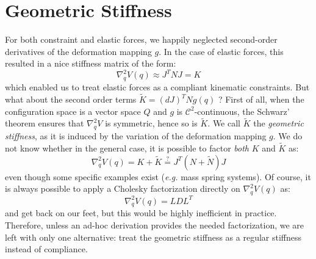 \documentclass{article}
\newcommand{\dd}{d}
\newcommand{\block}[1]{\left(#1\right)}
\begin{document}
\section{Geometric Stiffness}
%
For both constraint and elastic forces, we happily neglected
second-order derivatives of the deformation mapping $g$. In the case
of elastic forces, this resulted in a nice stiffness matrix of the
form:
%
\begin{equation}
  \nabla_q^2 V(q) \approx J^T N J = K
\end{equation}
%
which enabled us to treat elastic forces as a compliant kinematic
constraints. But what about the second order terms $\tilde{K}=(\dd
J)^T N g(q)$ ? First of all, when the configuration space is a vector
space $Q$ and $g$ is $\mathcal{C}^2$-continuous, the Schwarz' theorem
ensures that $\nabla_q^2 V$ is symmetric, hence so is $\tilde{K}$. We
call $\tilde{K}$ the \emph{geometric stiffness}, as it is induced by
the variation of the deformation mapping $g$. We do not know whether
in the general case, it is possible to factor \emph{both} $K$ and
$\tilde{K}$ as:
%
\begin{equation}
  \nabla_q^2 V(q) = K + \tilde{K} \overset{?}{=} J^T\block{N + \tilde{N}}J
\end{equation}
%
even though some specific examples exist (\emph{e.g.} mass spring
systems). Of course, it is always possible to apply a Cholesky
factorization directly on $\nabla_q^2 V(q)$ as:
%
\begin{equation}
  \nabla_q^2 V(q) = LDL^T
\end{equation}
%
and get back on our feet, but this would be highly inefficient in
practice. Therefore, unless an ad-hoc derivation provides the needed
factorization, we are left with only one alternative: treat the
geometric stiffness as a regular stiffness instead of compliance.
%
\end{document}
